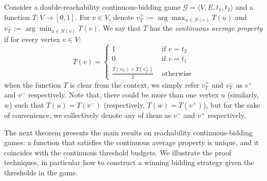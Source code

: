 \documentclass{theoretics}
\newcommand{\G}{{\mathcal G}}
\newcommand{\zug}[1]{\langle #1  \rangle}
\begin{document}
\begin{definition}
\label{def:continuous-average}
Consider a double-reachability continuous-bidding game $\G = \zug{V, E, t_1, t_2}$ and a function $T: V \rightarrow [0,1]$. For $v \in V$, denote $v^+_T := \arg\max_{u \in N(v)} T(u)$ and $v^-_T := \arg\min_{u \in N(v)} T(v)$. We say that $T$ has the {\em continuous average property} if for every vertex $v \in V$: 
\[T(v) = \begin{cases}
1 & \text{ if } v = t_2 \\
0 & \text{ if } v = t_1 \\
\frac{T(v^-_T) + T(v^+_T)}{2} & \text{ otherwise}
\end{cases}
\]
when the function \(T\) is clear from the context, we simply refer \(v^+_T\) and \(v^-_T\) as \(v^+\) and \(v^-\) respectively. 
Note that, there could be more than one vertex \(u\) (similarly, \(w\)) such that \(T(u) = T(v^-)\) (respectively, \(T(w) = T(v^+)\)), but for the sake of convenience, we collectively denote any of them as \(v^-\) and \(v^+\) respectively. 
\end{definition}

The next theorem presents the main results on reachability continuous-bidding games: a function that satisfies the continuous average property is unique, and it coincides with the continuous threshold budgets. We illustrate the proof techniques, in particular how to construct a winning bidding strategy given the thresholds in the game.
\end{document}
